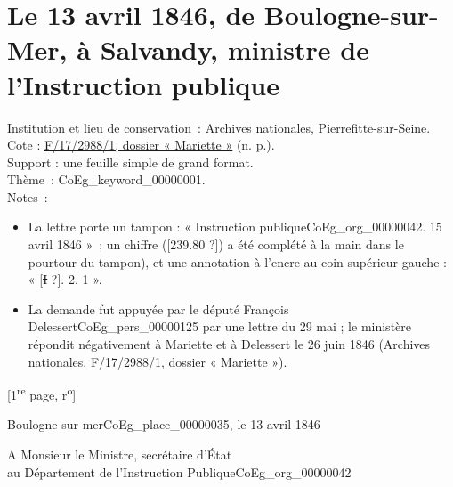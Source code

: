 \documentclass{book}
\begin{document}
\section*{Le 13 avril 1846, de Boulogne-sur-Mer, à Salvandy, ministre de l’Instruction publique}
 \label{labCoEg_Mariette_1846-04-13}
{\footnotesize
\noindent Institution et lieu de conservation~: Archives nationales, Pierrefitte-sur-Seine.\\
Cote : \hyperlink{CoEg_Mariette_ms_002}{F/17/2988/1, dossier « Mariette »} (n. p.).\\
Support : une feuille simple de grand format.\\
Thème~: \gls{CoEg_keyword_00000001}.\\
Notes~:\begin{itemize}
\item La lettre porte un tampon : « Instruction publique\gls{CoEg_org_00000042}. 15 avril 1846 »~; un chiffre ([239.80 ?]) a été complété à la main dans le pourtour du tampon), et une annotation à l’encre au coin supérieur gauche : « [\sout{I} ?]. 2. 1 ».
\item La demande fut appuyée par le député François Delessert\gls{CoEg_pers_00000125} par une lettre du 29 mai ; le ministère répondit négativement à Mariette et à Delessert le 26 juin 1846 (Archives nationales, F/17/2988/1, dossier « Mariette »).
\end{itemize}
\begin{center} {[1\textsuperscript{re} page, r\textsuperscript{o}]}\end{center}}
\begin{flushright}Boulogne-sur-mer\gls{CoEg_place_00000035}, le 13 avril 1846\end{flushright}
\par A Monsieur le Ministre, secrétaire d’État\\
\indent au Département de l’Instruction Publique\gls{CoEg_org_00000042}\\
\end{document}
